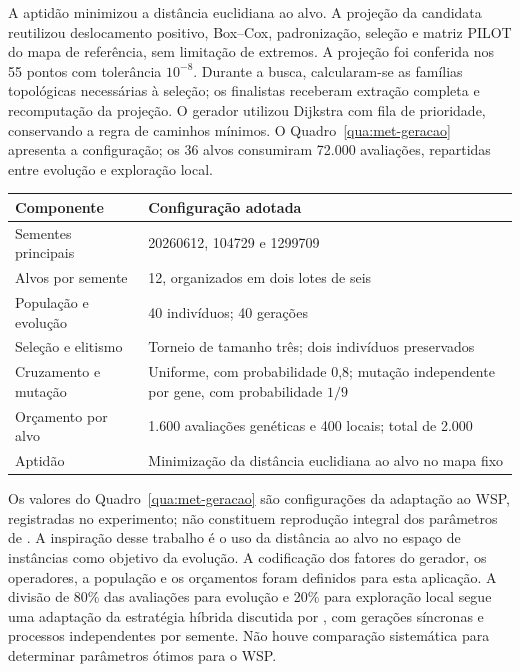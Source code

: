 A aptidão minimizou a distância euclidiana ao alvo. A projeção da candidata
reutilizou deslocamento positivo, Box--Cox, padronização, seleção e matriz
PILOT do mapa de referência, sem limitação de extremos. A projeção foi
conferida nos 55 pontos com tolerância $10^{-8}$. Durante a busca,
calcularam-se as famílias topológicas necessárias à seleção; os finalistas
receberam extração completa e recomputação da projeção. O gerador utilizou
Dijkstra com fila de prioridade, conservando a regra de caminhos mínimos.
O Quadro~\ref{qua:met-geracao} apresenta a configuração; os 36 alvos
consumiram 72.000 avaliações, repartidas entre evolução e exploração local.

\begin{quadro}[htbp]
\centering
\caption{Configuração da geração orientada de instâncias.}
\label{qua:met-geracao}
\begin{singlespace}
\normalsize
\begin{tabular}{|p{5.0cm}|p{8.0cm}|}
\hline
\textbf{Componente} & \textbf{Configuração adotada} \\
\hline
Sementes principais & 20260612, 104729 e 1299709 \\
\hline
Alvos por semente & 12, organizados em dois lotes de seis \\
\hline
População e evolução & 40 indivíduos; 40 gerações \\
\hline
Seleção e elitismo & Torneio de tamanho três; dois indivíduos preservados \\
\hline
Cruzamento e mutação & Uniforme, com probabilidade 0,8; mutação independente por gene, com probabilidade $1/9$ \\
\hline
Orçamento por alvo & 1.600 avaliações genéticas e 400 locais; total de 2.000 \\
\hline
Aptidão & Minimização da distância euclidiana ao alvo no mapa fixo \\
\hline
\end{tabular}
\par\smallskip
{}
\end{singlespace}
\end{quadro}

Os valores do Quadro~\ref{qua:met-geracao} são configurações da adaptação
ao WSP, registradas no experimento; não constituem reprodução integral dos
parâmetros de . A inspiração desse trabalho
é o uso da distância ao alvo no espaço de instâncias como objetivo da
evolução. A codificação dos fatores do gerador, os operadores, a população
e os orçamentos foram definidos para esta aplicação. A divisão de 80\%
das avaliações para evolução e 20\% para exploração local segue uma
adaptação da estratégia híbrida discutida por ,
com gerações síncronas e processos independentes por semente. Não houve
comparação sistemática para determinar parâmetros ótimos para o WSP.

